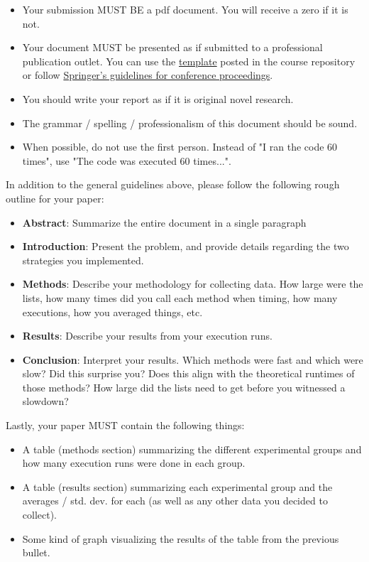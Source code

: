 \documentclass[paper=a4, fontsize=11pt, parskip=full]{scrartcl} %
\numberwithin{equation}{section} %
\numberwithin{figure}{section} %
\numberwithin{table}{section} %
\begin{document}
\begin{itemize}
	\item Your submission MUST BE a pdf document. You will receive a zero if it is not.
	\item Your document MUST be presented as if submitted to a professional publication outlet. You can use the \href{https://uva-cs.github.io/dsa1/homeworks/WordPaperTemplate.zip}{template} posted in the course repository or follow \href{https://www.springer.com/us/computer-science/lncs/conference-proceedings-guidelines}{Springer's guidelines for conference proceedings}.
	\item You should write your report as if it is original novel research.
	\item The grammar / spelling / professionalism of this document should be sound.
	\item When possible, do not use the first person. Instead of "I ran the code 60 times", use "The code was executed 60 times...".
\end{itemize}

In addition to the general guidelines above, please follow the following rough outline for your paper:

\begin{itemize}
	\item \textbf{Abstract}: Summarize the entire document in a single paragraph
	\item \textbf{Introduction}: Present the problem, and provide details regarding the two strategies you implemented.
	\item \textbf{Methods}: Describe your methodology for collecting data. How large were the lists, how many times did you call each method when timing, how many executions, how you averaged things, etc.
	\item \textbf{Results}: Describe your results from your execution runs.
	\item \textbf{Conclusion}: Interpret your results. Which methods were fast and which were slow? Did this surprise you? Does this align with the theoretical runtimes of those methods? How large did the lists need to get before you witnessed a slowdown?
\end{itemize}

Lastly, your paper MUST contain the following things:

\begin{itemize}
	\item A table (methods section) summarizing the different experimental groups and how many execution runs were done in each group.
	\item A table (results section) summarizing each experimental group and the averages / std. dev. for each (as well as any other data you decided to collect).
	\item Some kind of graph visualizing the results of the table from the previous bullet.
\end{itemize}


\end{document}
